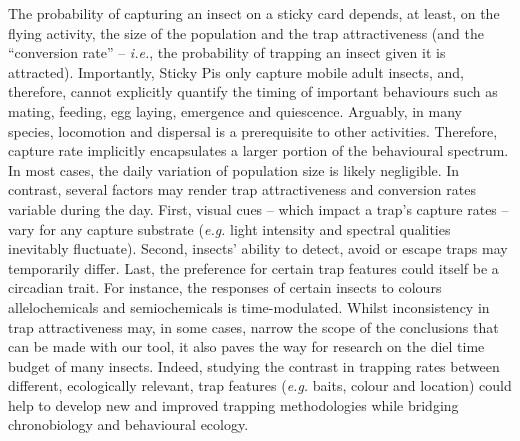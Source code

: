 \documentclass[12pt]{article}
\begin{document}
\begin{linenumbers}
		The probability of capturing an insect on a sticky card depends, at least, on the flying activity, the size of the population and the trap attractiveness (and the ``conversion rate'' – \emph{i.e.}, the probability of trapping an insect given it is attracted). Importantly, Sticky Pis only capture mobile adult insects, and, therefore, cannot explicitly quantify the timing of important behaviours such as mating, feeding, egg laying, emergence and quiescence.
		Arguably, in many species, locomotion and dispersal is a prerequisite to other activities. Therefore, capture rate implicitly encapsulates a larger portion of the behavioural spectrum.
		In most cases, the daily variation of population size is likely negligible. In contrast, several factors may render trap attractiveness and conversion rates variable during the day. First, visual cues – which impact a trap’s capture rates\cite{clare_pheromone_2000, sukovata_importance_2020} – vary for any capture substrate (\emph{e.g.} light intensity and spectral qualities inevitably fluctuate).
		Second, insects' ability to detect, avoid or escape traps may temporarily differ. Last, the preference for certain trap features could itself be a circadian trait. For instance, the responses of certain insects to colours\cite{lazopulo_daytime_2019} allelochemicals\cite{barrozo_response_2004,eilerts_odor-specific_2018} and semiochemicals\cite{rosen_circadian_2003, schendzielorz_time_2012, zhukovskaya_circadian_1995} is time-modulated.
		Whilst inconsistency in trap attractiveness may, in some cases, narrow the scope of the conclusions that can be made with our tool, it also paves the way for research on the diel time budget of many insects.
		Indeed, studying the contrast in trapping rates between different, ecologically relevant, trap features (\emph{e.g.} baits, colour and location) could help to develop new and improved trapping methodologies while bridging chronobiology and behavioural ecology.
		

\end{linenumbers}
\end{document}
